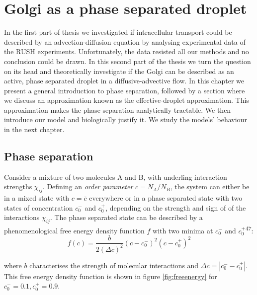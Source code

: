 \documentclass{Dissertate}
\begin{document}
\hypertarget{Golgi-as-a-phase-separated-droplet}{%
\chapter{Golgi as a phase separated
droplet}\label{Golgi-as-a-phase-separated-droplet}}

In the first part of thesis we investigated if intracellular transport could be described by an advection-diffusion equation by analysing experimental data of the RUSH experiments. Unfortunately, the data resisted all our methods and no conclusion could be drawn. In this second part of the thesis we turn the question on its head and theoretically investigate if the Golgi can be described as an active, phase separated droplet in a diffusive-advective flow. In this chapter we present a general introduction to phase separation, followed by a section where we discuss an approximation known as the effective-droplet approximation. This approximation makes the phase separation analytically tractable. We then introduce our model and biologically justify it. We study the models' behaviour in the next chapter.

\hypertarget{phase-separation}{%
\section{Phase separation}\label{phase-separation}}

Consider a mixture of two molecules A and B, with underling
interaction strengths \(\chi_{ij}\). Defining an \emph{order parameter}
\(c=N_A/N_B\), the system can either be in a mixed state with $c=\bar{c}$ everywhere or in a phase separated state with two states of concentration $c_0^-$ and $c_0^+$, depending on the strength and sign of 
of the interactions $\chi_{ij}$. The phase separated state can be described by a phenomenological free energy density function $f$ with two minima at $c_0^-$ and $c_0^+$\textsuperscript{47}:
\[
f(c) = \frac{b}{2(\Delta c)^2}(c-c_0^-)^2(c-c_0^+)^2
\]

where \(b\) characterises the strength of molecular interactions and
\(\Delta c = |c_0^--c_0^+|\). This free energy density function is shown in figure \ref{fig:freeenergy} for $c_0^-=0.1, c_0^+=0.9$.
\end{document}
